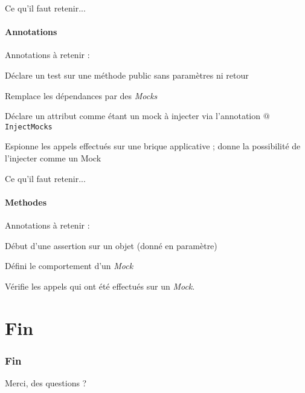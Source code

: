 \documentclass[compress]{beamer}%
\begin{document}
\begin{frame}{Ce qu'il faut retenir...}
	\framesubtitle{Annotations}
	
	Annotations à retenir :
	\begin{description}[<+->]
	\item[\texttt{$@$Test}] Déclare un test sur une méthode public sans paramètres ni retour
	\item[\texttt{$@$InjectMocks}] Remplace les dépendances par des \emph{Mocks}
	\item[\texttt{$@$Mock}] Déclare un attribut comme étant un mock à injecter via l'annotation \texttt{$@$InjectMocks}
	\item[\texttt{$@$Spy}] Espionne les appels effectués sur une brique applicative ; donne la possibilité de l'injecter comme un Mock
	\end{description}

\end{frame}

\begin{frame}{Ce qu'il faut retenir...}
	\framesubtitle{Methodes}
	
	Annotations à retenir :
	\begin{description}[<+->]
	\item[\texttt{assertThat}] Début d'une assertion sur un objet (donné en paramètre)
	\item[\texttt{when}] Défini le comportement d'un \emph{Mock}
	\item[\texttt{verify}] Vérifie les appels qui ont été effectués sur un \emph{Mock}.
	\end{description}

\end{frame}

\section*{Fin}

\begin{frame}
	\frametitle{Fin}
	\begin{center}
		\huge
		Merci, des questions ?
	\end{center}
\end{frame}
\end{document}
